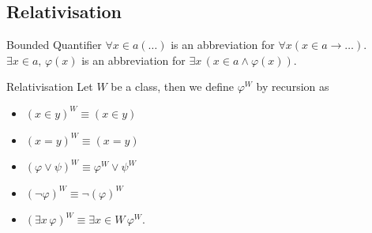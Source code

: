 \documentclass{article}
\begin{document}
\subsection{Relativisation}
\begin{fancydefine}{Bounded Quantifier}
    $\forall x \in a (\dots)$ is an abbreviation for $\forall x (x \in a \rightarrow \dots)$.\gap
    $\exists x \in a, \, \varphi(x)$ is an abbreviation for $\exists x \, (x \in a \wedge \varphi(x))$.
\end{fancydefine}
\begin{fancydefine}{Relativisation}
    Let $W$ be a class, then we define $\varphi^{W}$ by recursion as \begin{itemize}
        \item $(x \in y)^{W} \equiv (x \in y)$
        \item $(x = y)^{W} \equiv (x=y)$
        \item $(\varphi \vee \psi)^{W} \equiv \varphi^{W} \vee \psi^{W}$
        \item $(\neg \varphi)^{W} \equiv \neg (\varphi)^{W}$
        \item $(\exists x \, \varphi)^{W} \equiv \exists x \in W \, \varphi^{W}$.
    \end{itemize}
\end{fancydefine}
\end{document}
